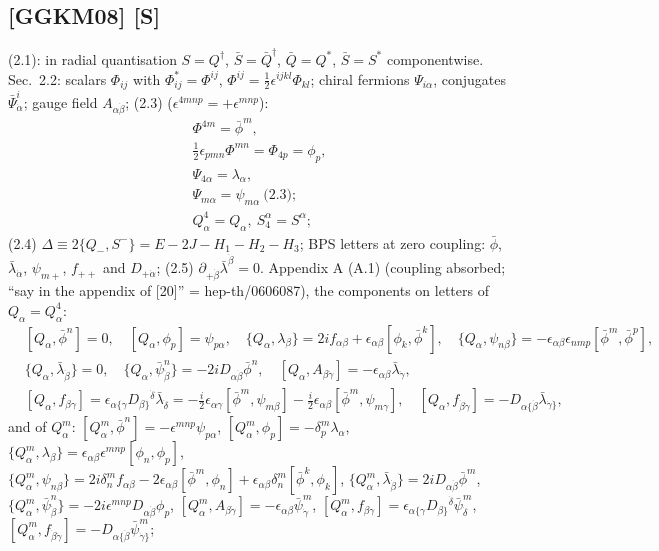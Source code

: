\documentclass[10pt]{article}
\begin{document}
\subsection{[GGKM08] [S]}
(2.1): in radial quantisation $S=Q^\dagger$, $\bar S=\bar Q^\dagger$, $\bar Q=Q^*$, $\bar S=S^*$ componentwise. Sec.\ 2.2: scalars $\Phi_{ij}$ with $\Phi^*_{ij}=\Phi^{ij}$, $\Phi^{ij}=\frac12\epsilon^{ijkl}\Phi_{kl}$; chiral fermions $\Psi_{i\alpha}$, conjugates $\bar\Psi^i_{\dot\alpha}$; gauge field $A_{\alpha\dot\beta}$; (2.3) ($\epsilon^{4mnp}=+\epsilon^{mnp}$):
\begin{gather*}
\Phi^{4m}=\bar\phi^m,\\ \tfrac12\epsilon_{pmn}\Phi^{mn}=\Phi_{4p}=\phi_p,\\ \Psi_{4\alpha}=\lambda_\alpha,\\ \Psi_{m\alpha}=\psi_{m\alpha}\ \text{(2.3)};\\ Q^4_\alpha=Q_\alpha,\ S^\alpha_4=S^\alpha;
\end{gather*}
(2.4) $\Delta\equiv2\{Q_-,S^-\}=E-2J-H_1-H_2-H_3$; BPS letters at zero coupling: $\bar\phi$, $\bar\lambda_{\dot\alpha}$, $\psi_{m+}$, $f_{++}$ and $D_{+\dot\alpha}$; (2.5) $\partial_{+\dot\beta}\bar\lambda^{\dot\beta}=0$. Appendix A (A.1) (coupling absorbed; ``say in the appendix of [20]'' = hep-th/0606087), the components on letters of $Q_\alpha=Q^4_\alpha$:
\begin{equation*}
\begin{aligned}
&[Q_\alpha,\bar\phi^n]=0,\quad [Q_\alpha,\phi_p]=\psi_{p\alpha},\quad \{Q_\alpha,\lambda_\beta\}=2if_{\alpha\beta}+\epsilon_{\alpha\beta}[\phi_k,\bar\phi^k],\quad \{Q_\alpha,\psi_{n\beta}\}=-\epsilon_{\alpha\beta}\epsilon_{nmp}[\bar\phi^m,\bar\phi^p],\\
&\{Q_\alpha,\bar\lambda_{\dot\beta}\}=0,\quad \{Q_\alpha,\bar\psi^n_{\dot\beta}\}=-2iD_{\alpha\dot\beta}\bar\phi^n,\quad [Q_\alpha,A_{\beta\dot\gamma}]=-\epsilon_{\alpha\beta}\bar\lambda_{\dot\gamma},\\
&[Q_\alpha,f_{\beta\gamma}]=\epsilon_{\alpha\{\gamma}D_{\beta\}}{}^{\dot\delta}\bar\lambda_{\dot\delta}=-\tfrac i2\epsilon_{\alpha\gamma}[\bar\phi^m,\psi_{m\beta}]-\tfrac i2\epsilon_{\alpha\beta}[\bar\phi^m,\psi_{m\gamma}],\quad [Q_\alpha,f_{\dot\beta\dot\gamma}]=-D_{\alpha\{\dot\beta}\bar\lambda_{\dot\gamma\}},
\end{aligned}
\end{equation*}
and of $Q^m_\alpha$: $[Q^m_\alpha,\bar\phi^n]=-\epsilon^{mnp}\psi_{p\alpha}$, $[Q^m_\alpha,\phi_p]=-\delta^m_p\lambda_\alpha$, $\{Q^m_\alpha,\lambda_\beta\}=\epsilon_{\alpha\beta}\epsilon^{mnp}[\phi_n,\phi_p]$, $\{Q^m_\alpha,\psi_{n\beta}\}=2i\delta^m_nf_{\alpha\beta}-2\epsilon_{\alpha\beta}[\bar\phi^m,\phi_n]+\epsilon_{\alpha\beta}\delta^m_n[\bar\phi^k,\phi_k]$, $\{Q^m_\alpha,\bar\lambda_{\dot\beta}\}=2iD_{\alpha\dot\beta}\bar\phi^m$, $\{Q^m_\alpha,\bar\psi^n_{\dot\beta}\}=-2i\epsilon^{mnp}D_{\alpha\dot\beta}\phi_p$, $[Q^m_\alpha,A_{\beta\dot\gamma}]=-\epsilon_{\alpha\beta}\bar\psi^m_{\dot\gamma}$, $[Q^m_\alpha,f_{\beta\gamma}]=\epsilon_{\alpha\{\gamma}D_{\beta\}}{}^{\dot\delta}\bar\psi^m_{\dot\delta}$, $[Q^m_\alpha,f_{\dot\beta\dot\gamma}]=-D_{\alpha\{\dot\beta}\bar\psi^m_{\dot\gamma\}}$;
\end{document}
